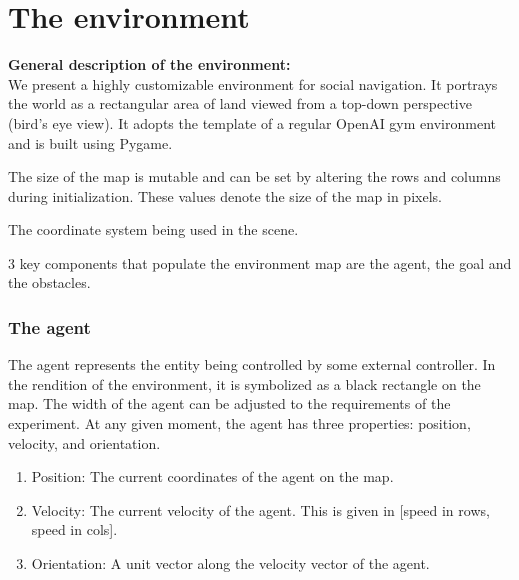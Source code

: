 \section{The environment}

\textbf{General description of the environment:}\\

We present a highly customizable environment for social navigation. It portrays the world as a rectangular area of land viewed from a top-down perspective (bird's eye view). It adopts the template of a regular OpenAI gym environment and is built using Pygame.

The size of the map is mutable and can be set by altering the rows and columns during initialization. These values denote the size of the map in pixels.

The coordinate system being used in the scene.

3 key components that populate the environment map are the agent, the goal and the obstacles.
\subsubsection*{The agent}

The agent represents the entity being controlled by some external controller. In the rendition of the environment, it is symbolized as a black rectangle on the map. The width of the agent can be adjusted to the requirements of the experiment. At any given moment, the agent has three properties: position, velocity, and orientation.
\begin{enumerate}
	\item Position: The current coordinates of the agent on the map.
	\item Velocity: The current velocity of the agent. This is given in [speed in rows, speed in cols].
	\item Orientation: A unit vector along the velocity vector of the agent.
\end{enumerate}

